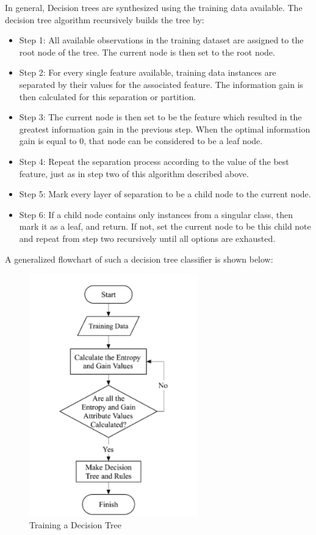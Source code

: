 \begin{appendices}
  In general, Decision trees are synthesized using the training data available. The decision tree algorithm recursively builds the tree\cite{bhiksha} by:
  \begin{itemize}
      \item Step 1: All available observations in the training dataset are assigned to the root node of the tree. The current node is then set to the root node.
      \item Step 2: For every single feature available, training data instances are separated by their values for the associated feature. The information gain is then calculated for this separation or partition.
      \item Step 3: The current node is then set to be the feature which resulted in the greatest information gain in the previous step. When the optimal information gain is equal to 0, that node can be considered to be a leaf node.
      \item Step 4: Repeat the separation process according to the value of the best feature, just as in step two of this algorithm described above.
      \item Step 5: Mark every layer of separation to be a child node to the current node.
      \item Step 6: If a child node contains only instances from a singular class, then mark it as a leaf, and return. If not, set the current node to be this child note and repeat from step two recursively until all options are exhausted.
  \end{itemize}

    A generalized flowchart of such a decision tree classifier is shown below:

    \begin{figure}[H]
    \centering
    \includegraphics[width=0.65\textwidth]{images/id3-dt.png}
    \caption{Training a Decision Tree}
    \label{fig:dt}
    \end{figure}
    \FloatBarrier



\end{appendices}
